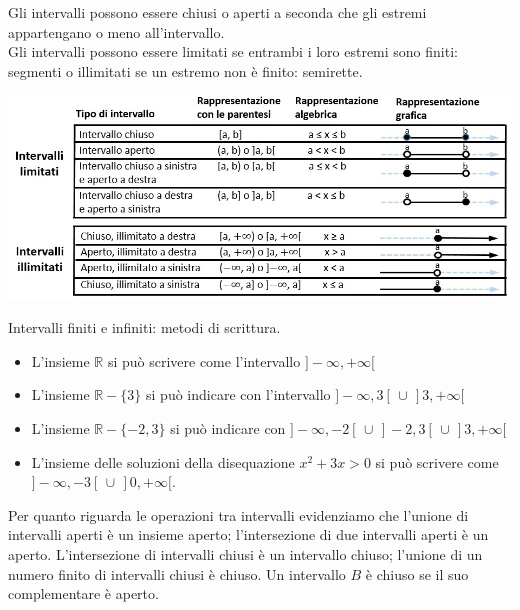 Gli intervalli possono essere chiusi o aperti a seconda che gli estremi 
appartengano o meno all'intervallo.\\
Gli intervalli possono essere limitati se entrambi i loro estremi sono 
finiti: segmenti o illimitati se un estremo non è finito: semirette.

  \begin{center}
  \includegraphics[width=1\textwidth]{img/top_tab.png}%
  \end{center}

\begin{esempio} Intervalli finiti e infiniti: metodi di scrittura.
  \begin{itemize} [noitemsep]
  \item[a)] L'insieme \(\mathbb{R}\) si può scrivere come 
l'intervallo \(]-\infty, +\infty[\)
  \item[b)] L'insieme \(\mathbb{R}-\{3\}\) si può indicare con 
l'intervallo \(]-\infty, 3[\,\cup\,]3,+\infty[\)
  \item[c)] L'insieme \(\mathbb{R}-\{-2,3\}\) si può indicare con 
\(]-\infty, -2[\,\cup\,]-2,3[\,\cup\,]3,+\infty[\)
  \item[d)] L'insieme delle soluzioni della disequazione 
\(x^2+3x>0\) si può scrivere come \(]-\infty,-3[\,\cup\,]0,+\infty[\).
  \end{itemize}
\end{esempio}
  
Per quanto riguarda le operazioni tra intervalli evidenziamo che l'unione di 
intervalli aperti è un insieme aperto; l'intersezione di due intervalli 
aperti è un aperto. L'intersezione di intervalli chiusi è un intervallo 
chiuso; l'unione di un numero finito di intervalli chiusi è chiuso. Un 
intervallo \(B\) è chiuso se il suo complementare è aperto.

